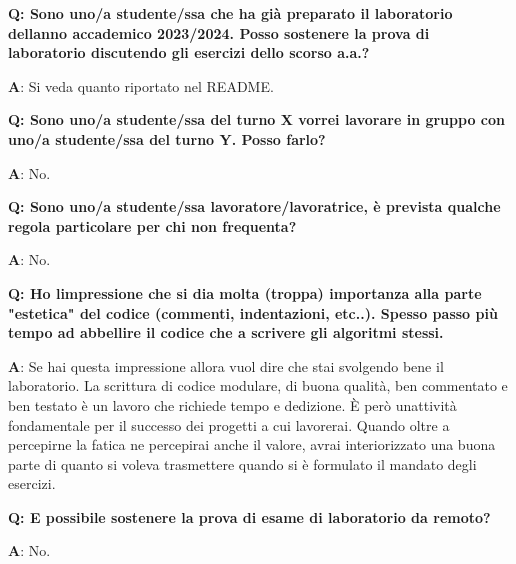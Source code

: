 {\bfseries{Q\+: Sono uno/a studente/ssa che ha già preparato il laboratorio dell\textquotesingle{}anno accademico 2023/2024. Posso sostenere la prova di laboratorio discutendo gli esercizi dello scorso a.\+a.?}}

{\bfseries{A}}\+: Si veda quanto riportato nel README.

{\bfseries{Q\+: Sono uno/a studente/ssa del turno X vorrei lavorare in gruppo con uno/a studente/ssa del turno Y. Posso farlo?}}

{\bfseries{A}}\+: No.

{\bfseries{Q\+: Sono uno/a studente/ssa lavoratore/lavoratrice, è prevista qualche regola particolare per chi non frequenta?}}

{\bfseries{A}}\+: No.

{\bfseries{Q\+: Ho l\textquotesingle{}impressione che si dia molta (troppa) importanza alla parte "{}estetica"{} del codice (commenti, indentazioni, etc..). Spesso passo più tempo ad abbellire il codice che a scrivere gli algoritmi stessi.}}

{\bfseries{A}}\+: Se hai questa impressione allora vuol dire che stai svolgendo bene il laboratorio. La scrittura di codice modulare, di buona qualità, ben commentato e ben testato è un lavoro che richiede tempo e dedizione. È però un\textquotesingle{}attività fondamentale per il successo dei progetti a cui lavorerai. Quando oltre a percepirne la fatica ne percepirai anche il valore, avrai interiorizzato una buona parte di quanto si voleva trasmettere quando si è formulato il mandato degli esercizi.

{\bfseries{Q\+: E\textquotesingle{} possibile sostenere la prova di esame di laboratorio da remoto?}}

{\bfseries{A}}\+: No. 